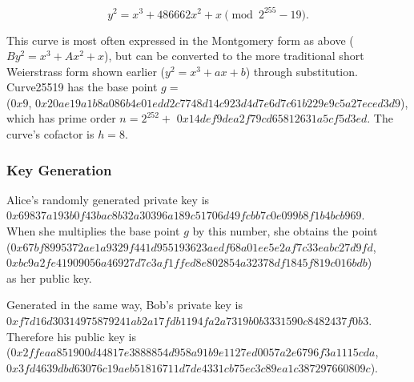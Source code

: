 \documentclass[12pt,a4paper]{article}
\begin{document}
\begin{equation}
    y^2 = x^3 + 486662x^2 + x \pmod{2^{255}-19}.
\end{equation}

This curve is most often expressed in the Montgomery \cite{montgomery1987speeding} form as above ($By^2 = x^3 + Ax^2 + x$), 
but can be converted to the more traditional short Weierstrass form shown earlier ($y^2 = x^3 + ax + b$) through substitution. 
Curve25519 has the base point $g = $ \\
({\footnotesize $0x9$}, {\footnotesize $0x20ae19a1b8a086b4e01edd2c7748d14c923d4d7e6d7c61b229e9c5a27eced3d9$}), \\
which has prime order $n = 2^{252} +$ {\footnotesize $0x14def9dea2f79cd65812631a5cf5d3ed$}. 
The curve's cofactor is $h = 8$. 


\subsubsection{Key Generation} \noindent
Alice's randomly generated private key is \\
{\footnotesize $0x69837a193b0f43bac8b32a30396a189c51706d49fcbb7c0e099b8f1b4bcb969$}. \\
When she multiplies the base point $g$ by this number, she obtains the point \\
({\footnotesize $0x67bf8995372ae1a9329f441d955193623aedf68a01ee5e2af7c33eabc27d9fd$}, \\
{\footnotesize $0xbc9a2fe41909056a46927d7c3af1ffed8e802854a32378df1845f819c016bdb$}) \\
as her public key.

Generated in the same way, Bob's private key is \\
{\footnotesize $0xf7d16d30314975879241ab2a17fdb1194fa2a7319b0b3331590c8482437f0b3$}. \\
Therefore his public key is \\
({\footnotesize $0x2ffeaa851900d44817e3888854d958a91b9e1127ed0057a2e6796f3a1115cda$}, \\
{\footnotesize $0x3fd4639dbd63076c19aeb51816711d7de4331cb75ec3c89ea1c387297660809c$}).
\end{document}
